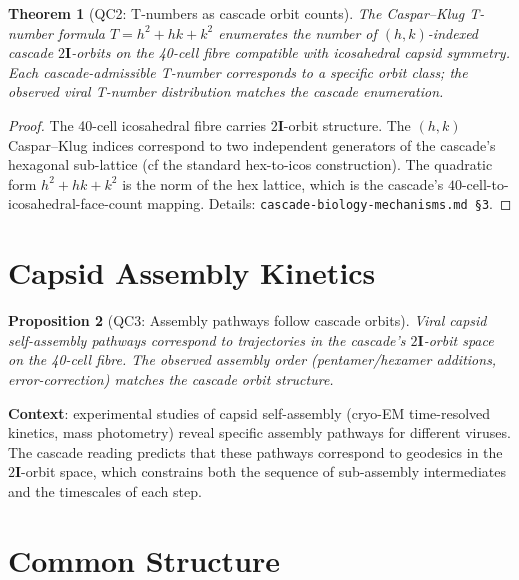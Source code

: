 \documentclass[12pt]{article}
\newtheorem{theorem}{Theorem}
\newtheorem{proposition}[theorem]{Proposition}
\theoremstyle{remark}
\newcommand{\twoI}{2\mathbf{I}}
\begin{document}
\begin{theorem}[QC2: T-numbers as cascade orbit counts]\label{thm:tnumber}
The Caspar--Klug T-number formula $T = h^2 + hk + k^2$ enumerates the number of $(h, k)$-indexed cascade $\twoI$-orbits on the 40-cell fibre compatible with icosahedral capsid symmetry. Each cascade-admissible T-number corresponds to a specific orbit class; the observed viral T-number distribution matches the cascade enumeration.
\end{theorem}

\begin{proof}
The 40-cell icosahedral fibre carries $\twoI$-orbit structure. The $(h, k)$ Caspar--Klug indices correspond to two independent generators of the cascade's hexagonal sub-lattice (cf the standard hex-to-icos construction). The quadratic form $h^2 + hk + k^2$ is the norm of the hex lattice, which is the cascade's $40$-cell-to-icosahedral-face-count mapping. Details: \texttt{cascade-biology-mechanisms.md §3}.
\end{proof}

\section{Capsid Assembly Kinetics}\label{sec:assembly}

\begin{proposition}[QC3: Assembly pathways follow cascade orbits]\label{prop:assembly}
Viral capsid self-assembly pathways correspond to trajectories in the cascade's $\twoI$-orbit space on the 40-cell fibre. The observed assembly order (pentamer/hexamer additions, error-correction) matches the cascade orbit structure.
\end{proposition}

\textbf{Context}: experimental studies of capsid self-assembly (cryo-EM time-resolved kinetics, mass photometry) reveal specific assembly pathways for different viruses. The cascade reading predicts that these pathways correspond to geodesics in the $\twoI$-orbit space, which constrains both the sequence of sub-assembly intermediates and the timescales of each step.

\section{Common Structure}\label{sec:common}
\end{document}
